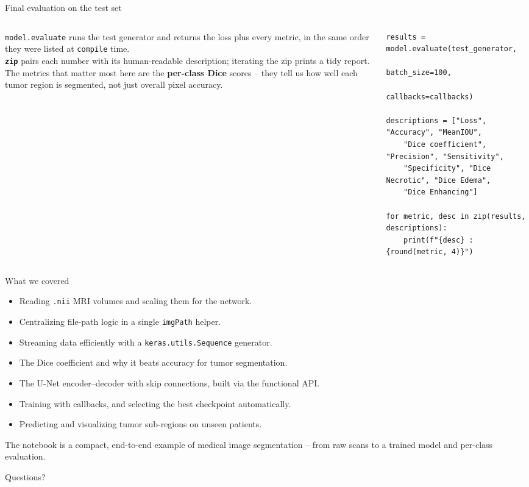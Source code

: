 \documentclass[10pt,aspectratio=169]{beamer}
\renewcommand{\section}[2][]{}
\begin{document}
\begin{frame}[fragile]{Final evaluation on the test set}
\begin{columns}[T,onlytextwidth]
\begin{column}{0.42\textwidth}
\small
\texttt{model.evaluate} runs the test generator and returns the loss plus every metric, in the same
order they were listed at \texttt{compile} time.\\[0.4em]
\textbf{\texttt{zip}} pairs each number with its human-readable description; iterating the zip prints a
tidy report.\\[0.4em]
The metrics that matter most here are the \textbf{per-class Dice} scores -- they tell us how well
each tumor region is segmented, not just overall pixel accuracy.
\end{column}
\begin{column}{0.56\textwidth}
\begin{lstlisting}[firstnumber=last]
results = model.evaluate(test_generator,
                         batch_size=100,
                         callbacks=callbacks)

descriptions = ["Loss", "Accuracy", "MeanIOU",
    "Dice coefficient", "Precision", "Sensitivity",
    "Specificity", "Dice Necrotic", "Dice Edema",
    "Dice Enhancing"]

for metric, desc in zip(results, descriptions):
    print(f"{desc} : {round(metric, 4)}")
\end{lstlisting}
\end{column}
\end{columns}
\end{frame}

\section{Conclusion}

\begin{frame}{What we covered}
  \begin{itemize}
    \item Reading \texttt{.nii} MRI volumes and scaling them for the network.
    \item Centralizing file-path logic in a single \texttt{imgPath} helper.
    \item Streaming data efficiently with a \texttt{keras.utils.Sequence} generator.
    \item The Dice coefficient and why it beats accuracy for tumor segmentation.
    \item The U-Net encoder--decoder with skip connections, built via the functional API.
    \item Training with callbacks, and selecting the best checkpoint automatically.
    \item Predicting and visualizing tumor sub-regions on unseen patients.
  \end{itemize}
  \vspace{0.5em}
  The notebook is a compact, end-to-end example of medical image segmentation -- from raw scans to a
  trained model and per-class evaluation.
\end{frame}

\begin{frame}[standout]
  Questions?
\end{frame}
\end{document}
